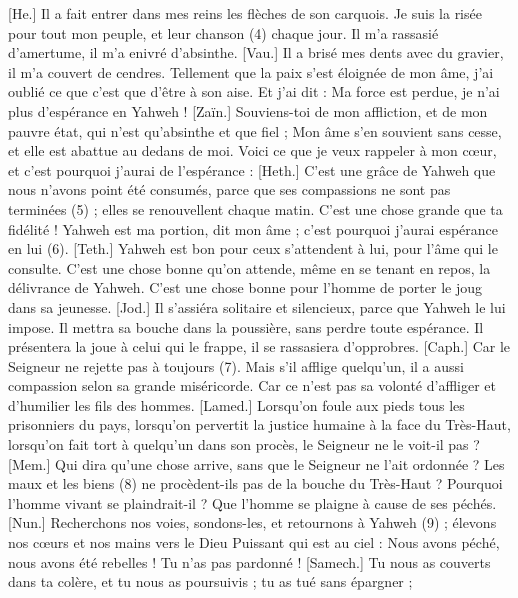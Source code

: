 \begin{multicols}{2}
[He.] Il a fait entrer dans mes reins les flèches de son carquois.
Je suis la risée pour tout mon peuple, et leur chanson (4) chaque jour.
Il m’a rassasié d’amertume, il m’a enivré d’absinthe.
[Vau.] Il a brisé mes dents avec du gravier, il m’a couvert de cendres.
Tellement que la paix s’est éloignée de mon âme, j’ai oublié ce que c’est que d’être à son aise.
Et j’ai dit : Ma force est perdue, je n'ai plus d'espérance en Yahweh !
[Zaïn.] Souviens-toi de mon affliction, et de mon pauvre état, qui n’est qu’absinthe et que fiel ;
Mon âme s’en souvient sans cesse, et elle est abattue au dedans de moi.
Voici ce que je veux rappeler à mon cœur, et c’est pourquoi j’aurai de l'espérance :
[Heth.] C’est une grâce de Yahweh que nous n’avons point été consumés, parce que ses compassions ne sont pas terminées (5) ;
elles se renouvellent chaque matin. C’est une chose grande que ta fidélité !
Yahweh est ma portion, dit mon âme ; c’est pourquoi j’aurai espérance en lui (6).
[Teth.] Yahweh est bon pour ceux s’attendent à lui, pour l’âme qui le consulte.
C’est une chose bonne qu’on attende, même en se tenant en repos, la délivrance de Yahweh.
C’est une chose bonne pour l’homme de porter le joug dans sa jeunesse.
[Jod.] Il s'assiéra solitaire et silencieux, parce que Yahweh le lui impose.
Il mettra sa bouche dans la poussière, sans perdre toute espérance.
Il présentera la joue à celui qui le frappe, il se rassasiera d’opprobres.
[Caph.] Car le Seigneur ne rejette pas à toujours (7).
Mais s’il afflige quelqu’un, il a aussi compassion selon sa grande miséricorde.
Car ce n’est pas sa volonté d'affliger et d'humilier les fils des hommes.
[Lamed.] Lorsqu’on foule aux pieds tous les prisonniers du pays,
lorsqu’on pervertit la justice humaine à la face du Très-Haut,
lorsqu’on fait tort à quelqu’un dans son procès, le Seigneur ne le voit-il pas ?
[Mem.] Qui dira qu'une chose arrive, sans que le Seigneur ne l’ait ordonnée ?
Les maux et les biens (8) ne procèdent-ils pas de la bouche du Très-Haut ?
Pourquoi l’homme vivant se plaindrait-il ? Que l’homme se plaigne à cause de ses péchés.
[Nun.] Recherchons nos voies, sondons-les, et retournons à Yahweh (9) ;
élevons nos cœurs et nos mains vers le Dieu Puissant qui est au ciel :
Nous avons péché, nous avons été rebelles ! Tu n’as pas pardonné !
[Samech.] Tu nous as couverts dans ta colère, et tu nous as poursuivis ; tu as tué sans épargner ;

\end{multicols}
